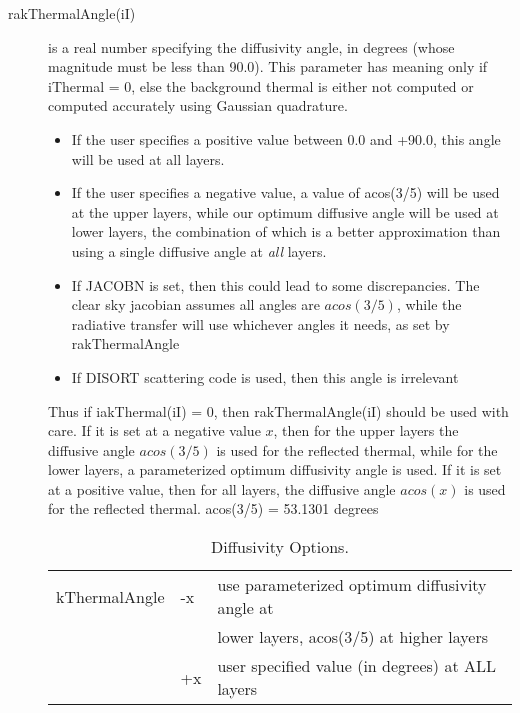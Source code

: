 \documentclass[12pt]{article}
\newlength{\colwidth}
\begin{document}
{\begin{description}
\item[{\sf rakThermalAngle(iI)}] is a real number specifying the diffusivity
angle, in degrees (whose magnitude must be less than 90.0).  This
parameter has meaning only if {\sf iThermal = 0}, else the
background thermal is either not computed or computed accurately
using Gaussian quadrature.
\begin{itemize}
\item If the user specifies a positive value between 0.0 and +90.0,
  this angle will be used at all layers.
\item If the user specifies a negative value, a value of acos(3/5)
  will be used at the upper layers, while our optimum diffusive angle
  will be used at lower layers, the combination of which is a better
  approximation than using a single diffusive angle at {\em all}
  layers.
\item If JACOBN is set, then this could lead to some discrepancies. The clear
sky jacobian assumes all angles are $acos(3/5)$, while the radiative transfer 
will use whichever angles it needs, as set by rakThermalAngle
\item If DISORT scattering code is used, then this angle is irrelevant
\end{itemize}

Thus if {\sf iakThermal(iI) = 0}, then {\sf rakThermalAngle(iI)} should be used
with care.  If it is set at a negative value $x$, then for the upper
layers the diffusive angle $acos(3/5)$ is used for the reflected
thermal, while for the lower layers, a parameterized optimum
diffusivity angle is used.  If it is set at a positive value, then for
all layers, the diffusive angle $acos(x)$ is used for the
reflected thermal. acos(3/5) = 53.1301 degrees

\begin{small}
\begin{longtable}{|l|lp{\colwidth}|}
\caption{Diffusivity Options.}\\
\hline
kThermalAngle& -x  & use parameterized optimum diffusivity angle at \\
             &     & lower layers, acos(3/5) at higher layers\\
             & +x  & user specified value (in degrees) at ALL layers\\
\hline
\end{longtable}
\end{small}


\end{description}}
\end{document}
